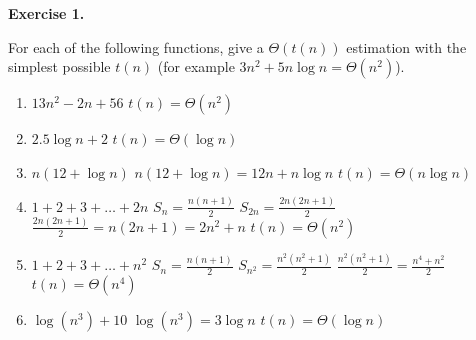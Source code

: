 \documentclass[12pt,letterpaper,final]{report}
\begin{document}
\vline

\noindent\textbf{Exercise 1.}  

\textbf{}

For each of the following functions, give a $\Theta(t(n))$ estimation with the simplest possible $t(n)$ (for example $3n^2 +5 n \log n = \Theta(n^2)$).

\begin{enumerate}

\item $13n^2 - 2n + 56$
\newline $t(n) = \Theta(n^2)$

\item $2.5 \log n + 2$
\newline $t(n) = \Theta(\log n)$

\item $n (12 + \log n)$
\newline $n (12 + \log n) = 12n + n \log n$
\newline $t(n) = \Theta(n \log n)$


\item $1+2 + 3 + \ldots + 2n$
\newline
\newline $S_n = \frac{n(n + 1)}{2}$
\newline $S_{2n} = \frac{2n(2n + 1)}{2}$
\newline $\frac{2n(2n + 1)}{2} = n (2n +1) = {2n^2} + n$
\newline $t(n) = \Theta(n^{2})$

\item $1+2 + 3 + \ldots + n^2$
\newline
\newline $S_n = \frac{n(n + 1)}{2}$
\newline $S_{n^2} = \frac{n^2(n^2 + 1)}{2}$
\newline $\frac{n^2(n^2 + 1)}{2} = \frac{n^4 + n^2}{2}$
\newline $t(n) = \Theta(n^{4})$

\item $\log (n^3) + 10$
\newline $\log (n^3) = 3\log n $
\newline $t(n) = \Theta(\log n)$


\end{enumerate}
\end{document}
